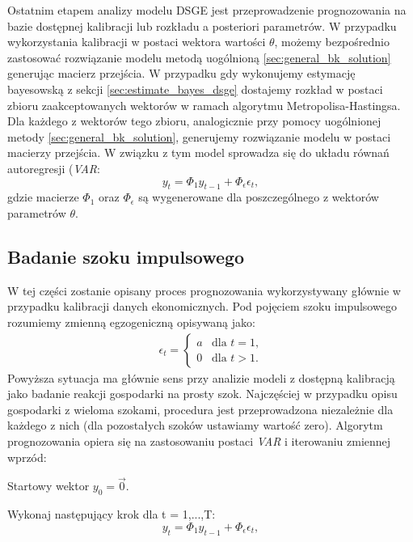Ostatnim etapem analizy modelu DSGE jest przeprowadzenie prognozowania na bazie dostępnej kalibracji lub rozkładu a posteriori parametrów. W przypadku wykorzystania kalibracji w postaci wektora wartości $\theta$, możemy bezpośrednio zastosować rozwiązanie modelu metodą uogólnioną \ref{sec:general_bk_solution} generując macierz przejścia. W przypadku gdy wykonujemy estymację bayesowską z sekcji \ref{sec:estimate_bayes_dsge} dostajemy rozkład w postaci zbioru zaakceptowanych wektorów w ramach algorytmu Metropolisa-Hastingsa. Dla każdego z wektorów tego zbioru, analogicznie przy pomocy uogólnionej metody \ref{sec:general_bk_solution}, generujemy rozwiązanie modelu w postaci macierzy przejścia. W związku z tym model sprowadza się do układu równań autoregresji (\emph{VAR}:
\begin{equation}
    \label{eqn:varModelProg}
    y_t = \Phi_1 y_{t-1}+\Phi_{\epsilon} \epsilon_t,
\end{equation}
gdzie macierze $\Phi_1$ oraz $\Phi_{\epsilon}$ są wygenerowane dla poszczególnego z wektorów parametrów $\theta$.

\subsection{Badanie szoku impulsowego}

W tej części zostanie opisany proces prognozowania wykorzystywany głównie w przypadku kalibracji danych ekonomicznych. Pod pojęciem szoku impulsowego rozumiemy zmienną egzogeniczną opisywaną jako: 
\begin{gather}
        \epsilon_{t} =
        \begin{cases}
            a & \text{dla $t = 1$,} \\
            0 & \text{dla $t > 1$.}
        \end{cases}
    \end{gather}
Powyższa sytuacja ma głównie sens przy analizie modeli z dostępną kalibracją jako badanie reakcji gospodarki na prosty szok. Najczęściej w przypadku opisu gospodarki z wieloma szokami, procedura jest przeprowadzona niezależnie dla każdego z nich (dla pozostałych szoków ustawiamy wartość zero). Algorytm prognozowania opiera się na zastosowaniu postaci \emph{VAR} i iterowaniu zmiennej wprzód:

\begin{algDefinition}

Startowy wektor $y_0 = \vec{0}$.

Wykonaj następujący krok dla t = 1,...,T:
\begin{equation}
    y_t = \Phi_1 y_{t-1} +\Phi_{\epsilon} \epsilon_t,
\end{equation}

\end{algDefinition}

